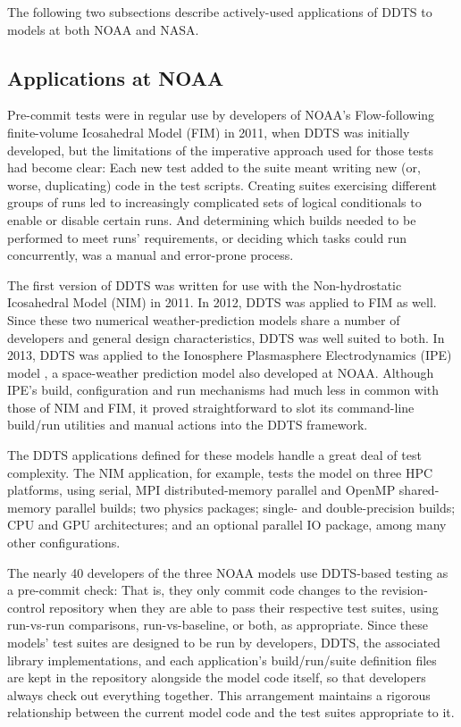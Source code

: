 \documentclass[conference]{IEEEtran}
\begin{document}
The following two subsections describe actively-used applications of DDTS to models at both NOAA and NASA.

\subsection{Applications at NOAA}

Pre-commit tests were in regular use by developers of NOAA's Flow-following finite-volume Icosahedral Model (FIM) \cite{fim} in 2011, when DDTS was initially developed, but the limitations of the imperative approach used for those tests had become clear: Each new test added to the suite meant writing new (or, worse, duplicating) code in the test scripts. Creating suites exercising different groups of runs led to increasingly complicated sets of logical conditionals to enable or disable certain runs. And determining which builds needed to be performed to meet runs' requirements, or deciding which tasks could run concurrently, was a manual and error-prone process.

The first version of DDTS was written for use with the Non-hydrostatic Icosahedral Model (NIM) \cite{nim} in 2011. In 2012, DDTS was applied to FIM as well. Since these two numerical weather-prediction models share a number of developers and general design characteristics, DDTS was well suited to both. In 2013, DDTS was applied to the Ionosphere Plasmasphere Electrodynamics (IPE) model \cite{ipe}, a space-weather prediction model also developed at NOAA. Although IPE's build, configuration and run mechanisms had much less in common with those of NIM and FIM, it proved straightforward to slot its command-line build/run utilities and manual actions into the DDTS framework.

The DDTS applications defined for these models handle a great deal of test complexity. The NIM application, for example, tests the model on three HPC platforms, using serial, MPI distributed-memory parallel and OpenMP shared-memory parallel builds; two physics packages; single- and double-precision builds; CPU and GPU architectures; and an optional parallel IO package, among many other configurations.

The nearly 40 developers of the three NOAA models use DDTS-based testing as a pre-commit check: That is, they only commit code changes to the revision-control repository when they are able to pass their respective test suites, using run-vs-run comparisons, run-vs-baseline, or both, as appropriate. Since these models' test suites are designed to be run by developers, DDTS, the associated library implementations, and each application's build/run/suite definition files are kept in the repository alongside the model code itself, so that developers always check out everything together. This arrangement maintains a rigorous relationship between the current model code and the test suites appropriate to it.
\end{document}
